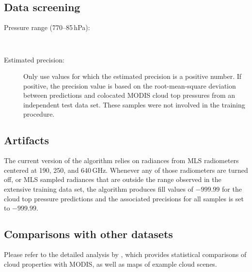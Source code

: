 \begin{nofloatpages}
\subsection{Data screening}
\label{sec:CldTopPScreening}
\begin{description}
  \item[Pressure range (770--85\,hPa):] \standardrangestatement\
  \item[Estimated precision:] Only use values for which the estimated precision is a positive number. If positive, the precision value is based on the root-mean-square deviation between predictions and colocated MODIS cloud top pressures from an independent test data set. These samples were not involved in the training procedure.
\end{description}
\end{nofloatpages}

\subsection{Artifacts}

The current version of the algorithm relies on radiances from MLS radiometers centered at 190, 250, and 640\,GHz. Whenever any of those radiometers are turned off, or MLS sampled radiances that are outside the range observed in the extensive training data set, the algorithm produces fill values of $-999.99$ for the cloud top pressure predictions and the associated precisions for all samples is set to $-999.99$.

\subsection{Comparisons with other datasets}
Please refer to the detailed analysis by \citet{WernerEtal:2021}, which provides statistical comparisons of cloud properties with MODIS, as well as maps of example cloud scenes.